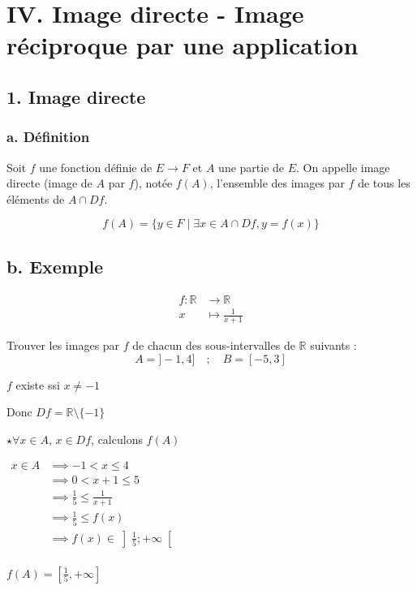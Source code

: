 \documentclass[a4paper,12pt]{article}
\begin{document}
\section*{\color{red}IV. Image directe - Image réciproque par une application}

\subsection*{\color{red}1. Image directe}

\subsubsection*{\color{red}a. Définition}
Soit $f$ une fonction définie de \( E \to F \) et \( A \) une partie de \( E \). On appelle image directe (image de \( A \) par \( f \)), notée \( f(A) \), l'ensemble des images par \( f \) de tous les éléments de \( A \cap Df \).

\[
f(A) = \{ y \in F \mid \exists x \in A \cap Df, y = f(x) \}
\]
\subsection*{\color{red}b. Exemple} %
    \[
    \begin{aligned}
 f : \mathbb{R} &\to \mathbb{R} \\
        x &\mapsto \frac{1}{x + 1}
    \end{aligned}
    \]

Trouver les images par \( f \) de chacun des sous-intervalles de \( \mathbb{R} \) suivants :
\[
A = ]-1, 4] \quad ; \quad B = [-5, 3]
\]

$f$ existe ssi $x\neq -1$ 

Donc $Df=\mathbb{R}\setminus\{-1\}$

$\star \forall x \in A$, $x\in Df$, calculons $f(A)$ 

$
\begin{aligned}
x \in A &\implies -1<x\leq 4\\
&\implies 0<x+1\leq 5\\
&\implies \frac{1}{5}\leq\frac{1}{x+1}\\
&\implies \frac{1}{5}\leq f(x)\\
&\implies f(x)\in \left]\frac{1}{5};+\infty\right[\\
\end{aligned}
$

$
f(A) = \left[ \frac{1}{5}, +\infty \right]
$
\end{document}
